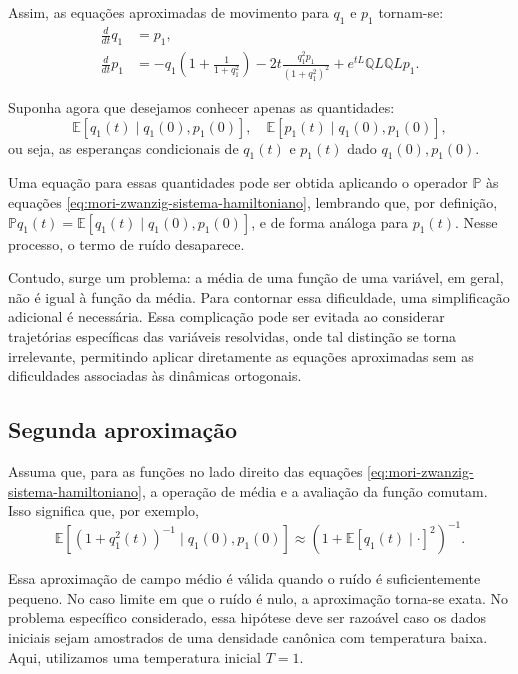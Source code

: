 Assim, as equações aproximadas de movimento para $q_1$ e $p_1$ tornam-se:
\begin{align}
	\frac{d}{dt} q_1 & = p_1, \nonumber \\
	\frac{d}{dt} p_1 & = -q_1\left(1 + \frac{1}{1 + q_1^2}\right) - 2t\frac{q_1^2 p_1}{(1 + q_1^2)^2} + e^{tL} \mathbb{Q}L \mathbb{Q}L p_1. \label{eq:mori-zwanzig-sistema-hamiltoniano}
\end{align}

Suponha agora que desejamos conhecer apenas as quantidades:
\begin{equation*}
	\mathbb{E}[q_1(t) \mid q_1(0), p_1(0)], \quad \mathbb{E}[p_1(t) \mid q_1(0), p_1(0)],
\end{equation*}
ou seja, as esperanças condicionais de $q_1(t)$ e $p_1(t)$ dado $q_1(0), p_1(0)$. 

Uma equação para essas quantidades pode ser obtida aplicando o operador $\mathbb{P}$ às equações \eqref{eq:mori-zwanzig-sistema-hamiltoniano}, lembrando que, por definição, $\mathbb{P}q_1(t) = \mathbb{E}[q_1(t) \mid q_1(0), p_1(0)]$, e de forma análoga para $p_1(t)$. Nesse processo, o termo de ruído desaparece.

Contudo, surge um problema: a média de uma função de uma variável, em geral, não é igual à função da média. Para contornar essa dificuldade, uma simplificação adicional é necessária. Essa complicação pode ser evitada ao considerar trajetórias específicas das variáveis resolvidas, onde tal distinção se torna irrelevante, permitindo aplicar diretamente as equações aproximadas sem as dificuldades associadas às dinâmicas ortogonais.

\subsection{Segunda aproximação}

Assuma que, para as funções no lado direito das equações \eqref{eq:mori-zwanzig-sistema-hamiltoniano}, a operação de média e a avaliação da função comutam. Isso significa que, por exemplo,
\begin{equation*}
    \mathbb{E}[(1 + q_1^2(t))^{-1} \mid q_1(0), p_1(0)] \approx \left(1 + \mathbb{E}[q_1(t) \mid \cdot]^2\right)^{-1}.
\end{equation*}

Essa aproximação de campo médio é válida quando o ruído é suficientemente pequeno. No caso limite em que o ruído é nulo, a aproximação torna-se exata. No problema específico considerado, essa hipótese deve ser razoável caso os dados iniciais sejam amostrados de uma densidade canônica com temperatura baixa. Aqui, utilizamos uma temperatura inicial \(T = 1\).


